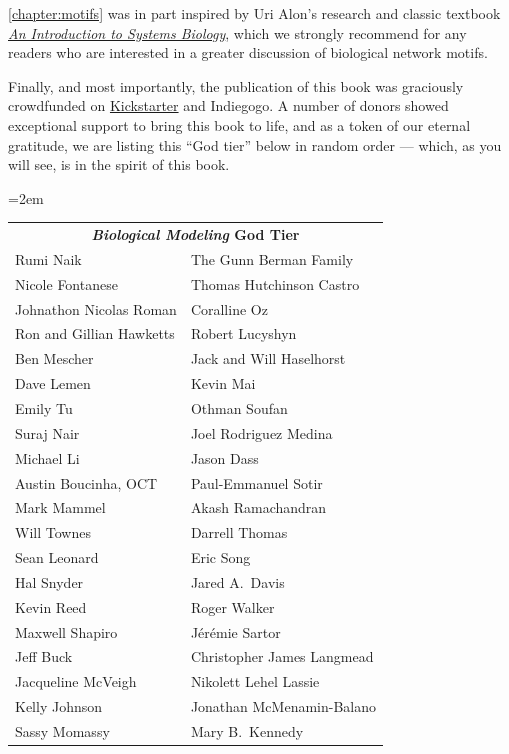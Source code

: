 \autoref{chapter:motifs} was in part inspired by Uri Alon’s research and classic textbook \href{https://www.weizmann.ac.il/mcb/UriAlon/introduction-systems-biology-design-principles-biological-circuits}{\textit{An Introduction to Systems Biology}}, which we strongly recommend for any readers who are interested in a greater discussion of biological network motifs.

Finally, and most importantly, the publication of this book was graciously crowdfunded on \href{https://www.kickstarter.com/projects/phillipcompeau/biological-modeling-a-short-tour?ref=user_menu}{Kickstarter} and Indiegogo. A number of donors showed exceptional support to bring this book to life, and as a token of our eternal gratitude, we are listing this ``God tier'' below in random order --- which, as you will see, is in the spirit of this book.
\begin{center}
\tabcolsep=2em
\begin{tabular}{l l}
\multicolumn{2}{c}{\textbf{\textit{Biological Modeling} God Tier}}\\[4ex]
Rumi Naik & The Gunn Berman Family\\
Nicole Fontanese & Thomas Hutchinson Castro\\
Johnathon Nicolas Roman & Coralline Oz\\
Ron and Gillian Hawketts & Robert Lucyshyn\\
Ben Mescher & Jack and Will Haselhorst\\
Dave Lemen & Kevin Mai\\
Emily Tu & Othman Soufan\\
Suraj Nair & Joel Rodriguez Medina\\
Michael Li & Jason Dass\\
Austin Boucinha, OCT & Paul-Emmanuel Sotir\\
Mark Mammel & Akash Ramachandran\\
Will Townes & Darrell Thomas\\
Sean Leonard & Eric Song\\
Hal Snyder & Jared A.~Davis\\
Kevin Reed & Roger Walker\\
Maxwell Shapiro & Jérémie Sartor\\
Jeff Buck & Christopher James Langmead\\
Jacqueline McVeigh & Nikolett Lehel Lassie\\
Kelly Johnson & Jonathan McMenamin-Balano\\
Sassy Momassy & Mary B.~Kennedy\\

\end{tabular}
\end{center}
